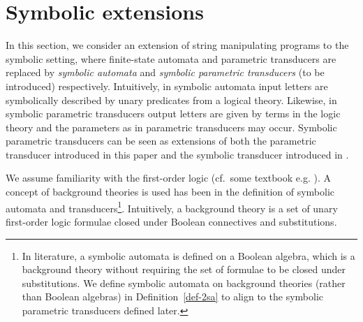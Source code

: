 
\section{Symbolic extensions}
\label{sec:symbolic}

In this section, we consider an extension of string manipulating programs to the symbolic setting, where finite-state automata and parametric transducers are replaced by \emph{symbolic automata} \cite{NG01,DV14} and \emph{symbolic parametric transducers} (to be introduced) respectively.
%
Intuitively, in symbolic automata %
input letters are symbolically described by unary predicates from a logical theory. %
%
Likewise, in symbolic parametric transducers %
output letters are given by terms in the logic theory and the parameters as in parametric transducers may occur.
Symbolic parametric transducers can be seen as extensions of both the parametric
transducer introduced in this paper and the symbolic transducer introduced in
\cite{symbolic-transducer}.


We assume familiarity with the %
first-order logic (cf.\ some textbook e.g. \cite{EFT94}). A concept of background theories is used has been in the definition of symbolic automata and transducers\footnote{In literature, a symbolic automata is defined on a Boolean algebra, which is a background theory without requiring the set of formulae to be closed under substitutions. We define symbolic automata on background theories (rather than Boolean algebras) in Definition~\ref{def-2sa} to align to the symbolic parametric transducers defined later.}.
Intuitively, 
a background theory is a set of unary first-order logic formulae closed under Boolean connectives and substitutions. 
 
